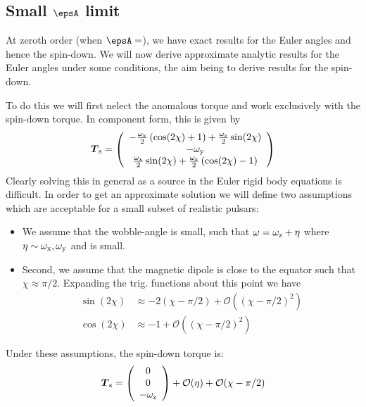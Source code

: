 \documentclass[/home/greg/Thesis/main/main.tex]{subfiles}
\begin{document}


\subsection{Small $\epsA$ limit}
At zeroth order (when $\epsA=$),  we have exact results for the Euler angles
and hence the spin-down. We will now derive approximate analytic results for
the Euler angles under some conditions, the aim being to derive results for the
spin-down.

To 
do this we will first nelect the anomalous torque and work exclusively with the
spin-down torque. In component form, this is given by
\begin{align}
\boldsymbol{T}_{\mathrm{s}} = \left(\begin{array}{c}
-\frac{\omega_{\mathrm{x}}}{2}\left(\cos(2\chi) + 1\right) + \frac{\omega_{\mathrm{z}}}{2}\sin(2\chi) \\
-\omega_{\mathrm{y}} \\
\frac{\omega_{\mathrm{x}}}{2}\sin(2\chi) + \frac{\omega_{\mathrm{z}}}{2}\left(\cos(2\chi) - 1\right) 
\end{array}\right)
\end{align}
Clearly solving this in general as a source in the Euler rigid body equations is
difficult. In order to get an approximate solution we will define two assumptions
which are acceptable for a small subset of realistic pulsars:
\begin{itemize}
\item We assume that the wobble-angle is small, such that $\omega = \omega_{\mathrm{z}} + \eta$
      where $\eta \sim \omega_{\mathrm{x}}, \omega_{\mathrm{y}}$ and is small.
\item Second, we assume that the magnetic dipole is close to the equator such
      that $\chi \approx \pi/2$. Expanding the trig. functions about this point
      we have
\begin{align}
\sin(2\chi) &\approx -2\left(\chi - \pi/2\right) + \mathcal{O}\left(\left(\chi - \pi/2\right)^{2}\right) \\
\cos(2\chi) &\approx -1 + \mathcal{O}\left(\left(\chi - \pi/2\right)^{2}\right)
\end{align}
\end{itemize}

Under these assumptions, the spin-down torque is:
\begin{align}
\boldsymbol{T}_{\mathrm{s}} = \left(\begin{array}{c}
0 \\
0 \\
-\omega_{\mathrm{z}} 
\end{array}\right) + \mathcal{O}(\eta) + \mathcal{O}(\chi - \pi/2)
\end{align}
\end{document}
